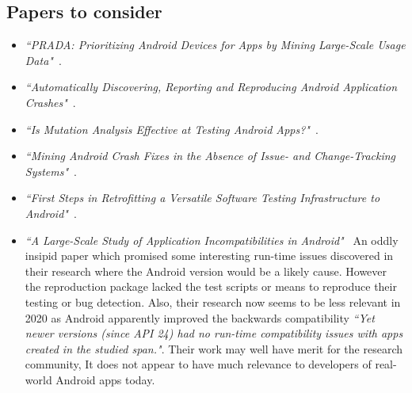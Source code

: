 \subsection{Papers to consider}
\begin{itemize}
    \item \emph{``PRADA: Prioritizing Android Devices for Apps by Mining Large-Scale Usage Data"}~\citep{lu2016_PRADA}. 
        
    \item \emph{``Automatically Discovering, Reporting and Reproducing Android Application Crashes"}~\citep{moran2016_automatically_drr_android_app_crashes}.
    
    \item \emph{``Is Mutation Analysis Effective at Testing Android Apps?"}~\citep{deng2017_is_mutation_analysis_effective_at_testing_android_apps}.
    
    \item \emph{``Mining Android Crash Fixes in the Absence of Issue- and Change-Tracking Systems"}~\citep{kong2019_mining_android_crash_fixes}.
    
    \item \emph{``First Steps in Retrofitting a Versatile Software Testing Infrastructure to Android"}~\citep{oliver2018_first_steps_in_retrofitting_a_versatile_sw_testing_architecture}.
    
    \item \emph{``A Large-Scale Study of Application Incompatibilities in Android"}~\citep{cai2019_large_scale_study_of_android_incompatibilities} An oddly insipid paper which promised some interesting run-time issues discovered in their research where the Android version would be a likely cause. However the reproduction package lacked the test scripts or means to reproduce their testing or bug detection. Also, their research now seems to be less relevant in 2020 as Android apparently improved the backwards compatibility \emph{``Yet newer versions (since API 24) had no run-time compatibility issues with apps created in the studied span."}. Their work may well have merit for the research community, It does not appear to have much relevance to developers of real-world Android apps today.
    

\end{itemize}
